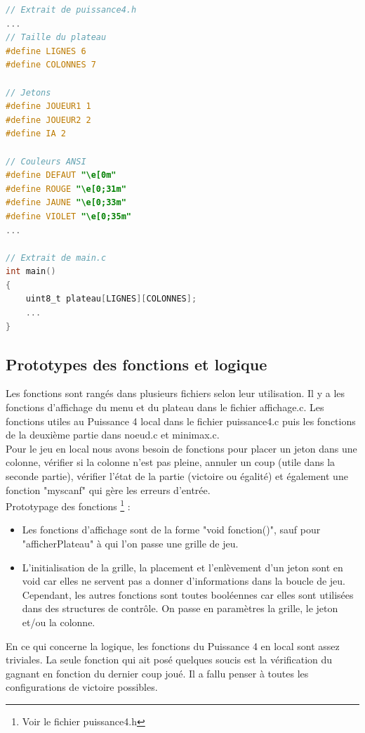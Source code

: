 \documentclass[a4paper,fleqn]{article}
\begin{document}
\begin{lstlisting}[language=C, caption=Représentation du puissance 4 et constantes en C]
// Extrait de puissance4.h
...
// Taille du plateau
#define LIGNES 6
#define COLONNES 7

// Jetons
#define JOUEUR1 1
#define JOUEUR2 2
#define IA 2

// Couleurs ANSI
#define DEFAUT "\e[0m"
#define ROUGE "\e[0;31m"
#define JAUNE "\e[0;33m"
#define VIOLET "\e[0;35m"
...

// Extrait de main.c
int main()
{    
	uint8_t plateau[LIGNES][COLONNES];
	...
}
\end{lstlisting}

\subsection{Prototypes des fonctions et logique}

Les fonctions sont rangés dans plusieurs fichiers selon leur utilisation. Il y a les fonctions d'affichage du menu et du plateau dans le fichier affichage.c. Les fonctions utiles au Puissance 4 local dans le fichier puissance4.c puis les fonctions de la deuxième partie dans noeud.c et minimax.c.\\

Pour le jeu en local nous avons besoin de fonctions pour placer un jeton dans une colonne, vérifier si la colonne n'est pas pleine, annuler un coup (utile dans la seconde partie), vérifier l'état de la partie (victoire ou égalité) et également une fonction "myscanf" qui gère les erreurs d'entrée. \\

Prototypage des fonctions \footnote{Voir le fichier puissance4.h} :

\begin{itemize}
\item Les fonctions d'affichage sont de la forme "void fonction()", sauf pour "afficherPlateau" à qui l'on passe une grille de jeu.
\item L'initialisation de la grille, la placement et l'enlèvement d'un jeton sont en void car elles ne servent pas a donner d'informations dans la boucle de jeu. Cependant, les autres fonctions sont toutes booléennes car elles sont utilisées dans des structures de contrôle. On passe en paramètres la grille, le jeton et/ou la colonne.
\end{itemize}
\vspace{0.5cm}

En ce qui concerne la logique, les fonctions du Puissance 4 en local sont assez triviales. La seule fonction qui ait posé quelques soucis est la vérification du gagnant en fonction du dernier coup joué. Il a fallu penser à toutes les configurations de victoire possibles.
\end{document}
